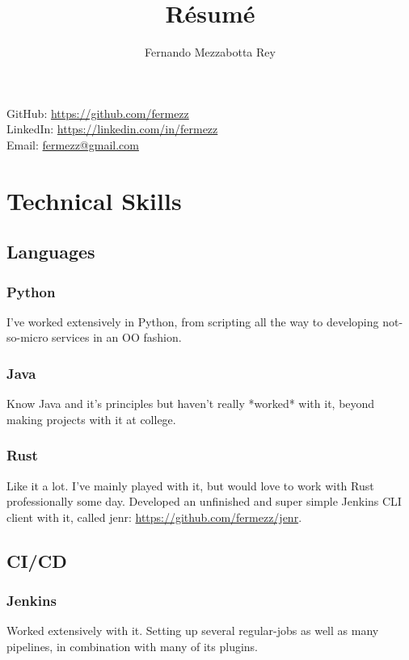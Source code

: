 \documentclass{article}
\makeatletter
\renewcommand{\maketitle}
{\begin{center}
{\huge\bfseries
\theauthor}

\vspace{.5em}

GitHub: \url{https://github.com/fermezz}\\LinkedIn: \url{https://linkedin.com/in/fermezz}\\Email: \url{fermezz@gmail.com}

\end{center}}
\makeatother
\begin{document}
\title{R\'esum\'e}
\author{Fernando Mezzabotta Rey}

\maketitle

\section{Technical Skills}
\subsection{Languages}
\subsubsection{Python}
  \begin{description}
    \item I've worked extensively in Python, from scripting all the way to developing not-so-micro services in an OO fashion.
  \end{description}
\subsubsection{Java}
  \begin{description}
    \item Know Java and it's principles but haven't really *worked* with it, beyond making projects with it at college.
  \end{description}
\subsubsection{Rust}
  \begin{description}
    \item Like it a lot. I've mainly played with it, but would love to work with Rust professionally some day. Developed an unfinished and super simple Jenkins CLI client with it, called jenr: \url{https://github.com/fermezz/jenr}.
  \end{description}
\subsection{CI/CD}
\subsubsection{Jenkins}
  \begin{description}
    \item Worked extensively with it. Setting up several regular-jobs as well as many pipelines, in combination with many of its plugins.
  \end{description}
\end{document}

